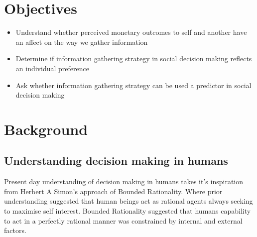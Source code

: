 \documentclass[man, floatsintext]{apa7}
\begin{document}
\section{Objectives}

\begin{itemize}
	\item Understand whether perceived monetary outcomes to self and another have an affect on the way we gather information
	\item Determine if information gathering strategy in social decision making reflects an individual preference
	\item Ask whether information gathering strategy can be used a predictor in social decision making
\end{itemize}

\section{Background}

\subsection{Understanding decision making in humans}

Present day understanding of decision making in humans takes it's inspiration from Herbert A Simon's approach of Bounded Rationality. Where prior understanding suggested that human beings act as  rational agents always seeking to maximise self interest. Bounded Rationality suggested that humans capability to act in a perfectly rational manner was constrained by internal and external factors.

\end{document}
